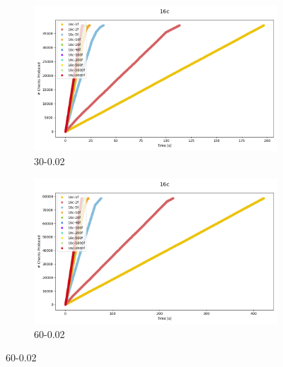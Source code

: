 \documentclass[12pt,a4paper]{article}
\begin{document}
\begin{figure}[H]
    \centering
    \begin{subfigure}[b]{\textwidth}
        \centering
        \includegraphics[scale=0.5]{../processed/NRT/small/checks/30-0.02/fixedcores/16c/plots/traces.png}
        \caption{30-0.02}
    \end{subfigure}
    
    \vspace{0.5cm} %
    \begin{subfigure}[b]{\textwidth}
        \centering
        \includegraphics[scale=0.5]{../processed/NRT/small/checks/60-0.02/fixedcores/16c/plots/traces.png}
        \caption{60-0.02}
    \end{subfigure}
    

\end{figure}
\end{document}
